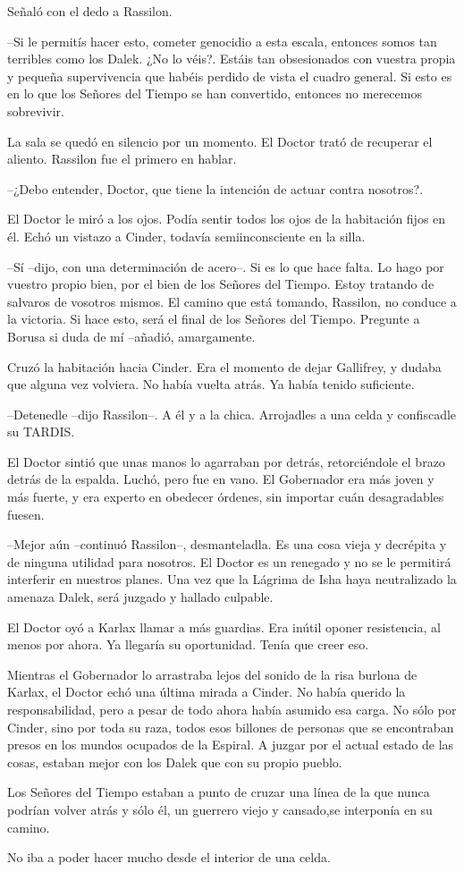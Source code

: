 Señaló con el dedo a Rassilon. 

--Si le permitís hacer esto, cometer genocidio a esta escala, entonces somos tan terribles como los Dalek. ¿No lo véis?. Estáis tan obsesionados con vuestra propia y pequeña supervivencia que habéis perdido de vista el cuadro general. Si esto es en lo que los Señores del Tiempo se han convertido, entonces no merecemos sobrevivir.

La sala se quedó en silencio por un momento. El Doctor trató de recuperar el aliento. Rassilon fue el primero en hablar. 

--¿Debo entender, Doctor, que tiene la intención de actuar contra nosotros?.

El Doctor le miró a los ojos. Podía sentir todos los ojos de la habitación fijos en él. Echó un vistazo a Cinder, todavía semiinconsciente en la silla. 

--Sí --dijo, con una determinación de acero--. Si es lo que hace falta. Lo hago por vuestro propio bien, por el bien de los Señores del Tiempo. Estoy tratando de salvaros de vosotros mismos. El camino que está tomando, Rassilon, no conduce a la victoria. Si hace esto, será el final de los Señores del Tiempo. Pregunte a Borusa si duda de mí --añadió, amargamente.

Cruzó la habitación hacia Cinder. Era el momento de dejar Gallifrey, y dudaba que alguna vez volviera. No había vuelta atrás. Ya había tenido suficiente.

--Detenedle --dijo Rassilon--. A él y a la chica. Arrojadles a una celda y confiscadle su TARDIS.

El Doctor sintió que unas manos lo agarraban por detrás, retorciéndole el brazo detrás de la espalda. Luchó, pero fue en vano. El Gobernador era más joven y más fuerte, y era experto en obedecer órdenes, sin importar cuán desagradables fuesen. 

--Mejor aún --continuó Rassilon--, desmanteladla. Es una cosa vieja y decrépita y de ninguna utilidad para nosotros. El Doctor es un renegado y no se le permitirá interferir en nuestros planes. Una vez que la Lágrima de Isha haya neutralizado la amenaza Dalek, será juzgado y hallado culpable.

El Doctor oyó a Karlax llamar a más guardias. Era inútil oponer resistencia, al menos por ahora. Ya llegaría su oportunidad. Tenía que creer eso.

Mientras el Gobernador lo arrastraba lejos del sonido de la risa burlona de Karlax, el Doctor echó una última mirada a Cinder. No había querido la responsabilidad, pero a pesar de todo ahora había asumido esa carga. No sólo por Cinder, sino por toda su raza, todos esos billones de personas que se encontraban presos en los mundos ocupados de la Espiral. A juzgar por el actual estado de las cosas, estaban mejor con los Dalek que con su propio pueblo.

Los Señores del Tiempo estaban a punto de cruzar una línea de la que nunca podrían volver atrás y sólo él, un guerrero viejo y cansado,se interponía en su camino.

No iba a poder hacer mucho desde el interior de una celda.


